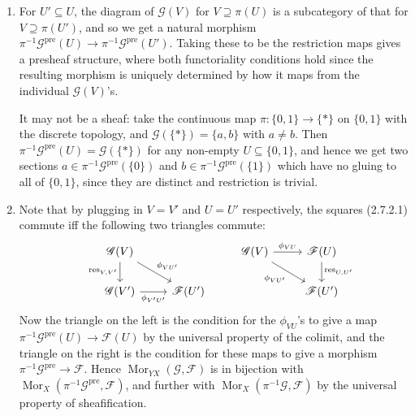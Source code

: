 \documentclass{report}
\newcommand{\pre}{{\mathrm{pre}}} %
\newcommand{\res}{{\mathrm{res}}} %
\newcommand{\scrF}{\mathscr{F}}
\newcommand{\scrG}{\mathscr{G}}
\DeclareMathOperator{\Mor}{Mor}
\begin{document}
\begin{enumerate}[label=\textbf{2.7.\Alph*.}]
	\item For $U'\subseteq U$, the diagram of $\scrG(V)$ for $V\supseteq\pi(U)$ is
	      a subcategory of that for $V\supseteq\pi(U')$, and so we get a natural
	      morphism $\pi^{-1}\scrG^\pre(U)\to\pi^{-1}\scrG^\pre(U')$. Taking these to be
	      the restriction maps gives a presheaf structure, where both
	      functoriality conditions hold since the resulting morphism is uniquely
	      determined by how it maps from the individual $\scrG(V)$'s.

	      It may not be a sheaf: take the continuous map $\pi:\{0,1\}\to\{*\}$ on
	      $\{0,1\}$ with the discrete topology, and $\scrG(\{*\})=\{a,b\}$ with
	      $a\ne b$. Then $\pi^{-1}\scrG^\pre(U)=\scrG(\{*\})$ for any non-empty
	      $U\subseteq\{0,1\}$, and hence we get two sections
	      $a\in\pi^{-1}\scrG^\pre(\{0\})$ and $b\in\pi^{-1}\scrG^\pre(\{1\})$ which have
	      no gluing to all of $\{0,1\}$, since they are distinct and restriction
	      is trivial.

	\item Note that by plugging in $V=V'$ and $U=U'$ respectively, the squares
	      (2.7.2.1) commute iff the following two triangles commute:
	      \begin{equation*}
		      \begin{tikzcd}
			      &\scrG(V) \arrow[swap]{d}{\res_{V,V'}} \arrow{dr}{\phi_{VU'}}
			      & \\
			      &\scrG(V') \arrow[swap]{r}{\phi_{V'U'}}
			      &\scrF(U')
		      \end{tikzcd}
		      \begin{tikzcd}
			      &\scrG(V) \arrow{r}{\phi_{VU}} \arrow[swap]{dr}{\phi_{VU'}}
			      &\scrF(U) \arrow{d}{\res_{U,U'}} \\
			      &
			      &\scrF(U')
		      \end{tikzcd}
	      \end{equation*}
	      Now the triangle on the left is the condition for the $\phi_{VU}$'s to
	      give a map $\pi^{-1}\scrG^\pre(U)\to\scrF(U)$ by the universal property of the
	      colimit, and the triangle on the right is the condition for these maps
	      to give a morphism $\pi^{-1}\scrG^\pre\to\scrF$. Hence $\Mor_{YX}(\scrG,\scrF)$ is
	      in bijection with $\Mor_X(\pi^{-1}\scrG^\pre,\scrF)$, and further with
	      $\Mor_X(\pi^{-1}\scrG,\scrF)$ by the universal property of sheafification.


\end{enumerate}
\end{document}

